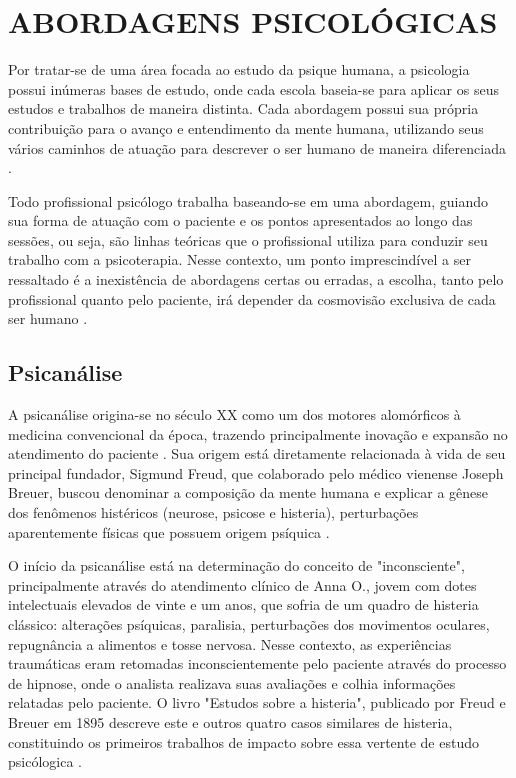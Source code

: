 \section{ABORDAGENS PSICOLÓGICAS}
\label{sec:abordagensPsicologicas}

Por tratar-se de uma área focada ao estudo da psique humana, a psicologia possui inúmeras bases de estudo, onde cada escola baseia-se para aplicar os seus estudos e trabalhos de maneira distinta. Cada abordagem possui sua própria contribuição para o avanço e entendimento da mente humana, utilizando seus vários caminhos de atuação para descrever o ser humano de maneira diferenciada \cite{Anhanguera2022}.

Todo profissional psicólogo trabalha baseando-se em uma abordagem, guiando sua forma de atuação com o paciente e os pontos apresentados ao longo das sessões, ou seja, são linhas teóricas que o profissional utiliza para conduzir seu trabalho com a psicoterapia. Nesse contexto, um ponto imprescindível a ser ressaltado é a inexistência de abordagens certas ou erradas, a escolha, tanto pelo profissional quanto pelo paciente, irá depender da cosmovisão exclusiva de cada ser humano \cite{Barros2022}.

\subsection{Psicanálise}
\label{sec:psicanalise}
A psicanálise origina-se no século XX como um dos motores alomórficos à medicina convencional da época, trazendo principalmente inovação e expansão no atendimento do paciente \cite{Barros2022}. Sua origem está diretamente relacionada à vida de seu principal fundador, Sigmund Freud, que colaborado pelo médico vienense Joseph Breuer, buscou denominar a composição da mente humana e explicar a gênese dos fenômenos histéricos (neurose, psicose e histeria), perturbações aparentemente físicas que possuem origem psíquica \cite{Clinica2017}.

O início da psicanálise está na determinação do conceito de "inconsciente", principalmente através do atendimento clínico de Anna O., jovem com dotes intelectuais elevados de vinte e um anos, que sofria de um quadro de histeria clássico: alterações psíquicas, paralisia, perturbações dos movimentos oculares, repugnância a alimentos e tosse nervosa. Nesse contexto, as experiências traumáticas eram retomadas inconscientemente pelo paciente através do processo de hipnose, onde o analista realizava suas avaliações e colhia informações relatadas pelo paciente. O livro "Estudos sobre a histeria", publicado por Freud e Breuer em 1895 descreve este e outros quatro casos similares de histeria, constituindo os primeiros trabalhos de impacto sobre essa vertente de estudo psicólogica \cite{Clinica2017}.

